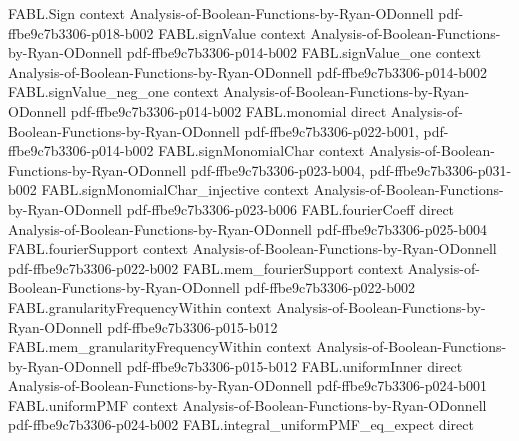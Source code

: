 \begin{theorem}
\label{FABL.FiniteFourierBasis.card_stableInfluencePolynomial_ge_le}
\leanok
{}
\proofstep
  {FABL.Sign}
  {context}
  {Analysis-of-Boolean-Functions-by-Ryan-ODonnell}
  {pdf-ffbe9c7b3306-p018-b002}
\proofstep
  {FABL.signValue}
  {context}
  {Analysis-of-Boolean-Functions-by-Ryan-ODonnell}
  {pdf-ffbe9c7b3306-p014-b002}
\proofstep
  {FABL.signValue_one}
  {context}
  {Analysis-of-Boolean-Functions-by-Ryan-ODonnell}
  {pdf-ffbe9c7b3306-p014-b002}
\proofstep
  {FABL.signValue_neg_one}
  {context}
  {Analysis-of-Boolean-Functions-by-Ryan-ODonnell}
  {pdf-ffbe9c7b3306-p014-b002}
\proofstep
  {FABL.monomial}
  {direct}
  {Analysis-of-Boolean-Functions-by-Ryan-ODonnell}
  {pdf-ffbe9c7b3306-p022-b001,
    pdf-ffbe9c7b3306-p014-b002}
\proofstep
  {FABL.signMonomialChar}
  {context}
  {Analysis-of-Boolean-Functions-by-Ryan-ODonnell}
  {pdf-ffbe9c7b3306-p023-b004,
    pdf-ffbe9c7b3306-p031-b002}
\proofstep
  {FABL.signMonomialChar_injective}
  {context}
  {Analysis-of-Boolean-Functions-by-Ryan-ODonnell}
  {pdf-ffbe9c7b3306-p023-b006}
\proofstep
  {FABL.fourierCoeff}
  {direct}
  {Analysis-of-Boolean-Functions-by-Ryan-ODonnell}
  {pdf-ffbe9c7b3306-p025-b004}
\proofstep
  {FABL.fourierSupport}
  {context}
  {Analysis-of-Boolean-Functions-by-Ryan-ODonnell}
  {pdf-ffbe9c7b3306-p022-b002}
\proofstep
  {FABL.mem_fourierSupport}
  {context}
  {Analysis-of-Boolean-Functions-by-Ryan-ODonnell}
  {pdf-ffbe9c7b3306-p022-b002}
\proofstep
  {FABL.granularityFrequencyWithin}
  {context}
  {Analysis-of-Boolean-Functions-by-Ryan-ODonnell}
  {pdf-ffbe9c7b3306-p015-b012}
\proofstep
  {FABL.mem_granularityFrequencyWithin}
  {context}
  {Analysis-of-Boolean-Functions-by-Ryan-ODonnell}
  {pdf-ffbe9c7b3306-p015-b012}
\proofstep
  {FABL.uniformInner}
  {direct}
  {Analysis-of-Boolean-Functions-by-Ryan-ODonnell}
  {pdf-ffbe9c7b3306-p024-b001}
\proofstep
  {FABL.uniformPMF}
  {context}
  {Analysis-of-Boolean-Functions-by-Ryan-ODonnell}
  {pdf-ffbe9c7b3306-p024-b002}
\proofstep
  {FABL.integral_uniformPMF_eq_expect}
  {direct}

\end{theorem}
